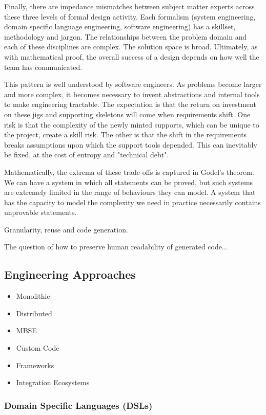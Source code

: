 \documentclass[preprint,12pt]{elsarticle}
\begin{document}
Finally, there are impedance mismatches between subject matter experts
across these three levels of formal design activity.  Each formalism
(system engineering, domain specific language engineering, software
engineering) has a skillset, methodology and jargon.  The relationships
between the problem domain and each of these disciplines are complex.
The solution space is broad. Ultimately, as with mathematical proof,
the overall success of a design depends on how well the team has
communicated.

This pattern is well understood by software engineers.  As problems
become larger and more complex, it becomes necessary to invent
abstractions and internal tools to make engineering tractable.
The expectation is that the return on investment on these jigs
and supporting skeletons will come when requirements shift.
One risk is that the complexity of the newly minted supports,
which can be unique to the project, create a skill risk.
The other is that the shift in the requirements breaks
assumptions upon which the support tools depended.  This 
can inevitably be fixed, at the cost of entropy and
"technical debt".  

Mathematically, the extrema of these trade-offs is captured
in Godel's theorem.  We can have a system in which all statements
can be proved, but such systems are extremely limited in the
range of behaviours they can model.  A system that has the capacity
to model the complexity we need in practice necessarily 
contains unprovable statements.



Granularity, reuse and code generation.

The question of how to preserve human readability of generated code...

\subsection{Engineering Approaches}

\begin{itemize}
\item{Monolithic}
\item{Distributed}
\item{MBSE}
\item{Custom Code}
\item{Frameworks}
\item{Integration Ecosystems}
\end{itemize}

\subsubsection{Domain Specific Languages (DSLs)}
\end{document}
